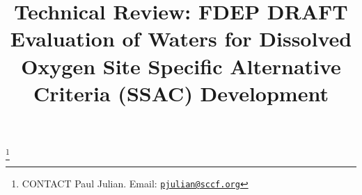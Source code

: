 \documentclass[]{interact}
\theoremstyle{plain}%
\theoremstyle{definition}
\theoremstyle{remark}
\begin{document}

\title{\textsf{Technical Review:} FDEP DRAFT Evaluation of Waters for
Dissolved Oxygen Site Specific Alternative Criteria (SSAC) Development}


\author{
}

\thanks{CONTACT Paul
Julian. Email: \href{mailto:pjulian@sccf.org}{\nolinkurl{pjulian@sccf.org}}}

\maketitle
\end{document}
